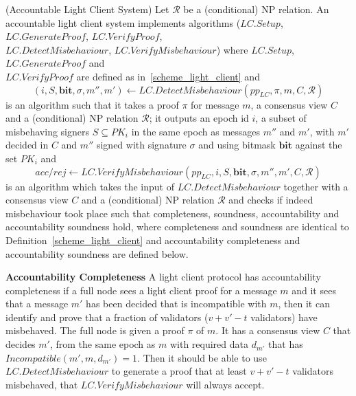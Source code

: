 \begin{definition}(Accountable Light Client System)  
\label{def:lc_accountable}
Let $\mathcal{R}$ be a (conditional) NP relation. An accountable light client 
system implements algorithms ($\mathit{LC.Setup}$, $\mathit{LC.GenerateProof}$, $\mathit{LC.VerifyProof}$, \\
$\mathit{LC.DetectMisbehaviour}$, $\mathit{LC.VerifyMisbehaviour}$) where 
$\mathit{LC.Setup}$, $\mathit{LC.GenerateProof}$ and \\ $\mathit{LC.VerifyProof}$ are 
defined as in~\ref{scheme_light_client} and 
$$(i, S, \mathbf{bit}, \sigma, m'', m') \leftarrow \mathit{LC.DetectMisbehaviour}(\mathit{pp_{\mathit{LC}}}, \pi, m, C,\mathcal{R})$$ 
is an algorithm such that it takes a proof $\pi$ for message $m$, a consensus view $C$ and a (conditional) NP relation $\mathcal{R}$;
it outputs an epoch id $i$, a subset of misbehaving signers $S \subseteq \mathit{PK_i}$ in the same epoch as messages $m''$ and $m'$, 
with $m'$ decided in $C$ and $m''$ signed with signature $\sigma$ and using bitmask $\mathbf{bit}$ against the set $\mathit{PK_i}$ 
and
$$ \mathit{acc}/\mathit{rej} \leftarrow \mathit{LC.VerifyMisbehaviour}(\mathit{pp_{\mathit{LC}}}, i, S, \mathbf{bit}, \sigma, m'', m', C, \mathcal{R})$$ 
is an algorithm which takes the input of $\mathit{LC.DetectMisbehaviour}$ together with a consensus view $C$ and a (conditional) NP relation $\mathcal{R}$ and 
checks if indeed misbehaviour took place such that completeness, soundness, accountability and accountability soundness hold, where completeness and soundness 
are identical to Definition~\ref{scheme_light_client} and accountability completeness and accountability soundness are defined below.
\end{definition}

\noindent \textbf{Accountability Completeness} A light client protocol has accountability completeness if a full node sees a light client proof for a message $m$ and it sees that a message $m'$ 
has been decided that is incompatible with $m$, then it can identify and prove that a fraction of validators ($v+v'-t$ validators) have misbehaved.
The full node is given a proof $\pi$ of $m$. It has  a consensus view $C$ that decides $m'$, from the same epoch as $m$ with required data $d_{m'}$ that has $\mathit{Incompatible}(m', m, d_{m'})=1$.
Then it should be able to use $\mathit{LC.DetectMisbehaviour}$ to generate a proof that at least $v+v'-t$ validators misbehaved, that $\mathit{LC.VerifyMisbehaviour}$ will always accept.\\

